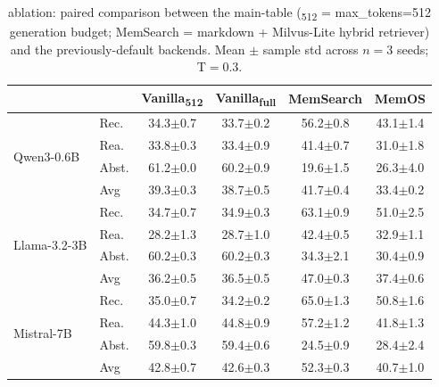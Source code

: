 \begin{table}[t]
\centering
\caption{\benchL{} ablation: paired comparison between the main-table (\textsubscript{512} = max\_tokens=512 generation budget; MemSearch = markdown + Milvus-Lite hybrid retriever) and the previously-default backends. Mean $\pm$ sample std across $n=3$ seeds; T$=$0.3.}
\label{tab:results-L-ablation}
\footnotesize
\setlength{\tabcolsep}{4pt}
\renewcommand{\arraystretch}{1.15}
\begin{tabular}{@{}ll | c c | c c @{}}
\toprule
 & & \textbf{Vanilla\textsubscript{512}} & \textbf{Vanilla\textsubscript{full}} & \textbf{MemSearch} & \textbf{MemOS} \\
\midrule
\multirow{4}{*}{Qwen3-0.6B} & Rec. & 34.3{\scriptsize$\pm$0.7} & 33.7{\scriptsize$\pm$0.2} & 56.2{\scriptsize$\pm$0.8} & 43.1{\scriptsize$\pm$1.4} \\
 & Rea. & 33.8{\scriptsize$\pm$0.3} & 33.4{\scriptsize$\pm$0.9} & 41.4{\scriptsize$\pm$0.7} & 31.0{\scriptsize$\pm$1.8} \\
 & Abst. & 61.2{\scriptsize$\pm$0.0} & 60.2{\scriptsize$\pm$0.9} & 19.6{\scriptsize$\pm$1.5} & 26.3{\scriptsize$\pm$4.0} \\
 & Avg & 39.3{\scriptsize$\pm$0.3} & 38.7{\scriptsize$\pm$0.5} & 41.7{\scriptsize$\pm$0.4} & 33.4{\scriptsize$\pm$0.2} \\
\midrule
\multirow{4}{*}{Llama-3.2-3B} & Rec. & 34.7{\scriptsize$\pm$0.7} & 34.9{\scriptsize$\pm$0.3} & 63.1{\scriptsize$\pm$0.9} & 51.0{\scriptsize$\pm$2.5} \\
 & Rea. & 28.2{\scriptsize$\pm$1.3} & 28.7{\scriptsize$\pm$1.0} & 42.4{\scriptsize$\pm$0.5} & 32.9{\scriptsize$\pm$1.1} \\
 & Abst. & 60.2{\scriptsize$\pm$0.3} & 60.2{\scriptsize$\pm$0.3} & 34.3{\scriptsize$\pm$2.1} & 30.4{\scriptsize$\pm$0.9} \\
 & Avg & 36.2{\scriptsize$\pm$0.5} & 36.5{\scriptsize$\pm$0.5} & 47.0{\scriptsize$\pm$0.3} & 37.4{\scriptsize$\pm$0.6} \\
\midrule
\multirow{4}{*}{Mistral-7B} & Rec. & 35.0{\scriptsize$\pm$0.7} & 34.2{\scriptsize$\pm$0.2} & 65.0{\scriptsize$\pm$1.3} & 50.8{\scriptsize$\pm$1.6} \\
 & Rea. & 44.3{\scriptsize$\pm$1.0} & 44.8{\scriptsize$\pm$0.9} & 57.2{\scriptsize$\pm$1.2} & 41.8{\scriptsize$\pm$1.3} \\
 & Abst. & 59.8{\scriptsize$\pm$0.3} & 59.4{\scriptsize$\pm$0.6} & 24.5{\scriptsize$\pm$0.9} & 28.4{\scriptsize$\pm$2.4} \\
 & Avg & 42.8{\scriptsize$\pm$0.7} & 42.6{\scriptsize$\pm$0.3} & 52.3{\scriptsize$\pm$0.3} & 40.7{\scriptsize$\pm$1.0} \\

\end{tabular}
\end{table}
